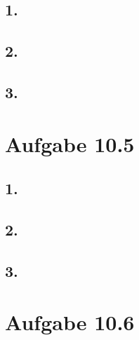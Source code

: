 \documentclass[12pt, paper=a4]{article}
\begin{document}
\subsection*{1.}
\subsection*{2.}
\subsection*{3.}


\section*{Aufgabe 10.5}
\subsection*{1.}
\subsection*{2.}
\subsection*{3.}

\section*{Aufgabe 10.6}
\end{document}
